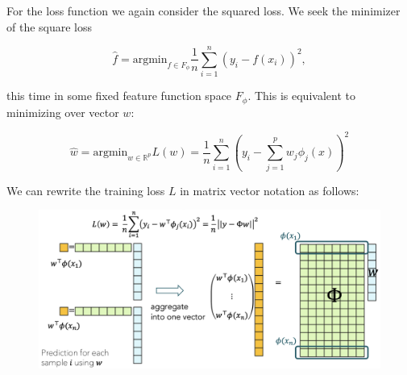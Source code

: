 \documentclass[a4paper]{extarticle}
\begin{document}
For the loss function we again consider the squared loss. We seek the minimizer of the square loss

\[
    \hat{f} = \text{argmin}_{f \in F_{\phi}} \frac{1}{n} \sum_{i = 1}^n (y_i - f(x_i))^2,
\]

this time in some fixed feature function space \(F_{\phi}\). This is equivalent to minimizing over vector \(w\):

\[
    \hat{w} = \text{argmin}_{w \in \mathbb{R}^p} L(w) = \frac{1}{n} \sum_{i = 1}^n (y_i - \sum_{j = 1}^p w_j \phi_j(x))^2
\]

We can rewrite the training loss \(L\) in matrix vector notation as follows:

\begin{figure}[H]
    \includegraphics[width=13cm]{../images/IntroML_Fig2-4}
    \centering
\end{figure}
\end{document}
